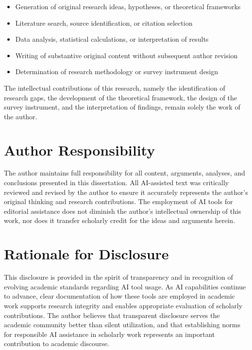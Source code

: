 \begin{itemize}
    \item Generation of original research ideas, hypotheses, or theoretical frameworks
    \item Literature search, source identification, or citation selection
    \item Data analysis, statistical calculations, or interpretation of results
    \item Writing of substantive original content without subsequent author revision
    \item Determination of research methodology or survey instrument design
\end{itemize}

The intellectual contributions of this research, namely the identification of research gaps, the development of the theoretical framework, the design of the survey instrument, and the interpretation of findings, remain solely the work of the author.

\section{Author Responsibility}

The author maintains full responsibility for all content, arguments, analyses, and conclusions presented in this dissertation. All AI-assisted text was critically reviewed and revised by the author to ensure it accurately represents the author's original thinking and research contributions. The employment of AI tools for editorial assistance does not diminish the author's intellectual ownership of this work, nor does it transfer scholarly credit for the ideas and arguments herein.

\section{Rationale for Disclosure}

This disclosure is provided in the spirit of transparency and in recognition of evolving academic standards regarding AI tool usage. As AI capabilities continue to advance, clear documentation of how these tools are employed in academic work supports research integrity and enables appropriate evaluation of scholarly contributions. The author believes that transparent disclosure serves the academic community better than silent utilization, and that establishing norms for responsible AI assistance in scholarly work represents an important contribution to academic discourse.
